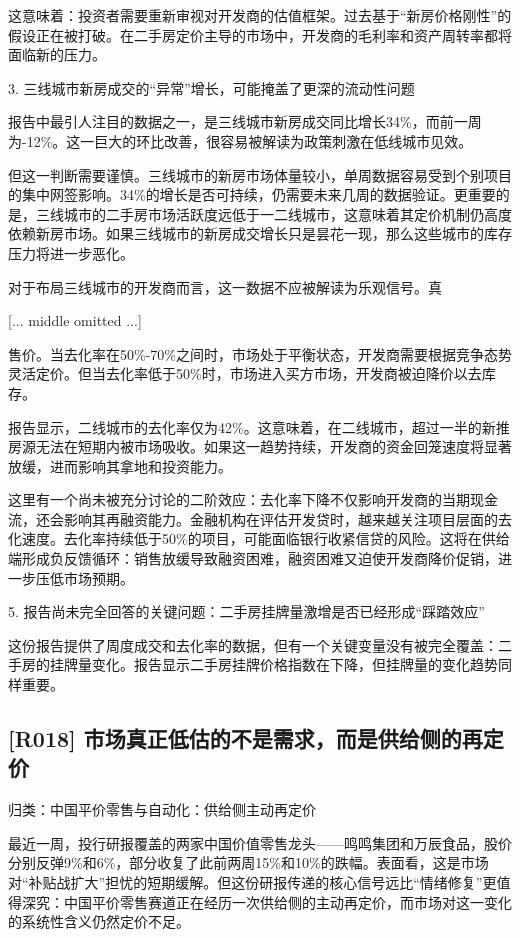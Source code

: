 \documentclass[11pt]{ctexart}
\begin{document}
这意味着：投资者需要重新审视对开发商的估值框架。过去基于“新房价格刚性”的假设正在被打破。在二手房定价主导的市场中，开发商的毛利率和资产周转率都将面临新的压力。

3. 三线城市新房成交的“异常”增长，可能掩盖了更深的流动性问题

报告中最引人注目的数据之一，是三线城市新房成交同比增长34\%，而前一周为-12\%。这一巨大的环比改善，很容易被解读为政策刺激在低线城市见效。

但这一判断需要谨慎。三线城市的新房市场体量较小，单周数据容易受到个别项目的集中网签影响。34\%的增长是否可持续，仍需要未来几周的数据验证。更重要的是，三线城市的二手房市场活跃度远低于一二线城市，这意味着其定价机制仍高度依赖新房市场。如果三线城市的新房成交增长只是昙花一现，那么这些城市的库存压力将进一步恶化。

对于布局三线城市的开发商而言，这一数据不应被解读为乐观信号。真

[... middle omitted ...]

售价。当去化率在50\%-70\%之间时，市场处于平衡状态，开发商需要根据竞争态势灵活定价。但当去化率低于50\%时，市场进入买方市场，开发商被迫降价以去库存。

报告显示，二线城市的去化率仅为42\%。这意味着，在二线城市，超过一半的新推房源无法在短期内被市场吸收。如果这一趋势持续，开发商的资金回笼速度将显著放缓，进而影响其拿地和投资能力。

这里有一个尚未被充分讨论的二阶效应：去化率下降不仅影响开发商的当期现金流，还会影响其再融资能力。金融机构在评估开发贷时，越来越关注项目层面的去化速度。去化率持续低于50\%的项目，可能面临银行收紧信贷的风险。这将在供给端形成负反馈循环：销售放缓导致融资困难，融资困难又迫使开发商降价促销，进一步压低市场预期。

5. 报告尚未完全回答的关键问题：二手房挂牌量激增是否已经形成“踩踏效应”

这份报告提供了周度成交和去化率的数据，但有一个关键变量没有被完全覆盖：二手房的挂牌量变化。报告显示二手房挂牌价格指数在下降，但挂牌量的变化趋势同样重要。

\subsection{[R018] 市场真正低估的不是需求，而是供给侧的再定价}
{\small\color{refgray}归类：中国平价零售与自动化：供给侧主动再定价}

最近一周，投行研报覆盖的两家中国价值零售龙头——鸣鸣集团和万辰食品，股价分别反弹9\%和6\%，部分收复了此前两周15\%和10\%的跌幅。表面看，这是市场对“补贴战扩大”担忧的短期缓解。但这份研报传递的核心信号远比“情绪修复”更值得深究：中国平价零售赛道正在经历一次供给侧的主动再定价，而市场对这一变化的系统性含义仍然定价不足。
\end{document}
